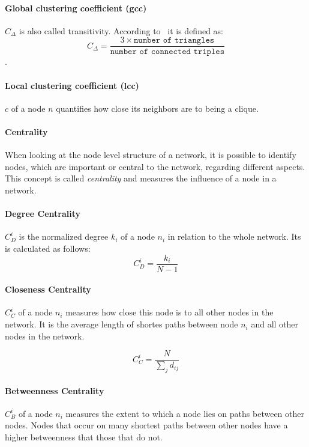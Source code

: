 \paragraph{Global clustering coefficient (gcc)} $C_\Delta$ is also called transitivity. According to~\textcite{wasserman1994social} it is defined as: $$C_\Delta = \frac{3 \times \texttt{number of triangles}}{\texttt{number of connected triples}}$$.

\paragraph{Local clustering coefficient (lcc)} $c$ of a node $n$ quantifies how close its neighbors are
to being a clique.

\paragraph{Centrality}
When looking at the node level structure of a network, it is possible to identify nodes, which are important or central to the network, regarding different aspects. This concept is called \emph{centrality} and measures the influence of a node in a network.

\paragraph{Degree Centrality}
$C^i_D$ is the normalized degree $k_i$ of a node $n_i$ in relation to the whole network. Its is calculated as follows:
$$C^i_D=\frac{k_i}{N-1}$$

\paragraph{Closeness Centrality}
$C^i_C$ of a node $n_i$ measures how close this node is to all other nodes in the network. 
It is the average length of shortes paths between node $n_i$ and all other nodes in the network.

$$C_C^i=\frac{N}{\sum_{j}d_{ij}}$$

\paragraph{Betweenness Centrality}
$C^i_B$ of a node $n_i$ measures the extent to which a node lies on paths between other nodes. Nodes that occur on many shortest paths between other nodes have a higher betweenness that those that do not.


